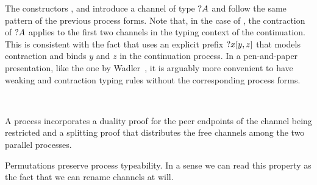 \begin{AgdaAlign}
The constructors ,
 and 
introduce a channel of type $\WhyNot A$ and follow the same pattern of the
previous process forms. Note that, in the case of
, the contraction of $\WhyNot A$ applies to
the first two channels in the typing context of the continuation. This is
consistent with the fact that \Calculus uses an explicit prefix
${?}x[y,z]$ that models contraction and binds $y$ and $z$ in the
continuation process. In a pen-and-paper presentation, like the one by
Wadler~\citep{Wadler14}, it is arguably more convenient to have weaking and
contraction typing rules without the corresponding process forms.

\begin{code}%
%
\>[3]%
\>[13]\AgdaSymbol{:}%
\>[284I]\AgdaSpace{}%
\AgdaSpace{}%
\AgdaSpace{}%
\AgdaSpace{}%
\AgdaSymbol{\}}\AgdaSpace{}%
\AgdaSymbol{(}\AgdaSpace{}%
\AgdaSymbol{:}\AgdaSpace{}%
\AgdaSpace{}%
\AgdaSpace{}%
\AgdaSymbol{)}\AgdaSpace{}%
\AgdaSymbol{(}\AgdaSpace{}%
\AgdaSymbol{:}\AgdaSpace{}%
\AgdaSpace{}%
\AgdaSpace{}%
\AgdaSpace{}%
\AgdaOperator{\AgdaDatatype{+}}\AgdaSpace{}%
\AgdaSymbol{)}\AgdaSpace{}%
\<%
\\
\>[.][@{}l@{}]\<[284I]%
\>[15]\AgdaSpace{}%
\AgdaSymbol{(}\AgdaSpace{}%
\AgdaSpace{}%
\AgdaSymbol{)}\AgdaSpace{}%
\AgdaSpace{}%
\AgdaSpace{}%
\AgdaSymbol{(}\AgdaSpace{}%
\AgdaSpace{}%
\AgdaSymbol{)}\AgdaSpace{}%
\AgdaSpace{}%
\AgdaSpace{}%
\<%
\end{code}

A  process incorporates a duality proof for the
peer endpoints of the channel being restricted and a splitting proof that
distributes the free channels among the two parallel processes.

\end{AgdaAlign}

Permutations preserve process typeability. In a sense we can read this property
as the fact that we can rename channels at will.

